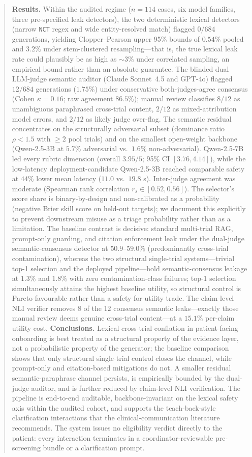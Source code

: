\documentclass[11pt]{article}
\begin{document}
\begin{abstract}
\textbf{Results.} Within the audited regime ($n=114$ cases, six model families, three pre-specified leak detectors), the two deterministic lexical detectors (narrow \texttt{NCT} regex and wide entity-resolved match) flagged $0/684$ generations, yielding Clopper--Pearson upper 95\% bounds of $0.54\%$ pooled and $3.2\%$ under stem-clustered resampling---that is, the true lexical leak rate could plausibly be as high as $\sim 3\%$ under correlated sampling, an empirical bound rather than an absolute guarantee. The blinded dual LLM-judge semantic auditor (Claude Sonnet~4.5 and GPT-4o) flagged $12/684$ generations ($1.75\%$) under conservative both-judges-agree consensus (Cohen $\kappa = 0.16$; raw agreement $86.5\%$); manual review classifies $8/12$ as unambiguous paraphrased cross-trial content, $2/12$ as mixed-attribution model errors, and $2/12$ as likely judge over-flag. The semantic residual concentrates on the structurally adversarial subset (dominance ratio $\rho<1.5$ with $\geq 2$ pool trials) and on the smallest open-weight backbone (Qwen-2.5-3B at $5.7\%$ adversarial vs.\ $1.6\%$ non-adversarial). Qwen-2.5-7B led every rubric dimension (overall $3.95/5$; 95\% CI $[3.76, 4.14]$), while the low-latency deployment-candidate Qwen-2.5-3B reached comparable safety at $44\%$ lower mean latency ($11.0$ vs.\ $19.8$ s). Inter-judge agreement was moderate (Spearman rank correlation $r_s \in [0.52, 0.56]$). The selector's score share is binary-by-design and non-calibrated as a probability (negative Brier skill score on held-out targets); we document this explicitly to prevent downstream misuse as a triage probability rather than as a limitation. The baseline contrast is decisive: standard multi-trial RAG, prompt-only guarding, and citation enforcement leak under the dual-judge semantic-consensus detector at $50.9$--$59.0\%$ (predominantly cross-trial contamination), whereas the two structural single-trial systems---trivial top-1 selection and the deployed pipeline---hold semantic-consensus leakage at $1.3\%$ and $1.8\%$ with zero contamination-class failures; top-1 selection simultaneously attains the highest baseline utility, so structural control is Pareto-favourable rather than a safety-for-utility trade. The claim-level NLI verifier removes $8$ of the $12$ consensus semantic leaks---exactly those manual review deems genuine cross-trial content---at a $15.1\%$ per-claim utility cost.
\textbf{Conclusions.} Lexical cross-trial conflation in patient-facing onboarding is best treated as a structural property of the evidence layer, not a probabilistic property of the generator; the baseline comparison shows that only structural single-trial control closes the channel, while prompt-only and citation-based mitigations do not. A smaller residual semantic-paraphrase channel persists, is empirically bounded by the dual-judge auditor, and is further reduced by claim-level NLI verification. The pipeline is end-to-end auditable, backbone-invariant on the lexical safety axis within the audited cohort, and supports the teach-back-style clarification interactions that the clinical-communication literature recommends. The system issues no eligibility verdict directly to the patient: every interaction terminates in a coordinator-reviewable pre-screening bundle or a clarification prompt.

\end{abstract}
\end{document}
